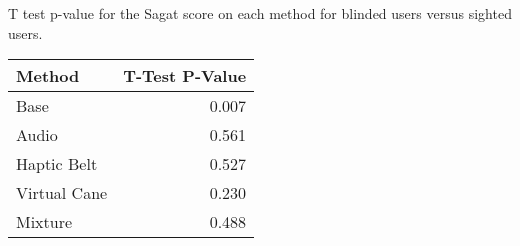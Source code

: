 
\centering
\caption{T test p-value for the Sagat score on each method for blinded users versus sighted users.}
\label{tab:ttest_sagat_score}
\begin{tabular}{lr}
\toprule
      Method &  T-Test P-Value \\
\midrule
        Base &           0.007 \\
       Audio &           0.561 \\
 Haptic Belt &           0.527 \\
Virtual Cane &           0.230 \\
     Mixture &           0.488 \\
\bottomrule
\end{tabular}
